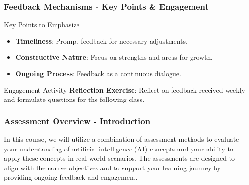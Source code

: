 \documentclass[aspectratio=169]{beamer}
\begin{document}
\begin{frame}[fragile]
    \frametitle{Feedback Mechanisms - Key Points & Engagement}
    \begin{block}{Key Points to Emphasize}
        \begin{itemize}
            \item \textbf{Timeliness}: Prompt feedback for necessary adjustments.
            \item \textbf{Constructive Nature}: Focus on strengths and areas for growth.
            \item \textbf{Ongoing Process}: Feedback as a continuous dialogue.
        \end{itemize}
    \end{block}

    \begin{block}{Engagement Activity}
        \textbf{Reflection Exercise}: Reflect on feedback received weekly and formulate questions for the following class.
    \end{block}
\end{frame}

\begin{frame}[fragile]
    \frametitle{Assessment Overview - Introduction}
    In this course, we will utilize a combination of assessment methods to evaluate your understanding of artificial intelligence (AI) concepts and your ability to apply these concepts in real-world scenarios. The assessments are designed to align with the course objectives and to support your learning journey by providing ongoing feedback and engagement.
\end{frame}
\end{document}
